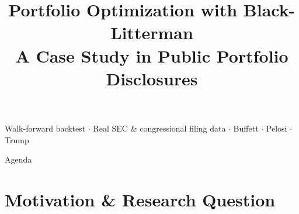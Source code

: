 \documentclass[aspectratio=169, 10pt]{beamer}
\title[BL Portfolio Optimization]{%
  Portfolio Optimization with Black-Litterman\\[4pt]
  \large A Case Study in Public Portfolio Disclosures}
\author{}
\date{}
\begin{document}

{
\begin{frame}[plain]
  \titlepage
  \vspace{-1.6em}
  \begin{center}
    \small
    \textcolor{blnavy!70}{
      Walk-forward backtest \(\cdot\) Real SEC \& congressional filing data \(\cdot\)
      Buffett \(\cdot\) Pelosi \(\cdot\) Trump}
  \end{center}
\end{frame}
}

\begin{frame}{Agenda}
  \tableofcontents
\end{frame}

\section{Motivation \& Research Question}
\end{document}
